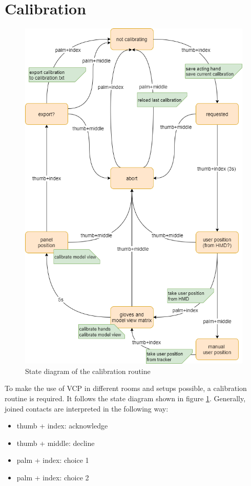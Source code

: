 \documentclass[hyperref, bachelorofscience]{cgvpub}
\begin{document}
\section{Calibration} \label{sec:cal}
\begin{figure}
	\centering
	\includegraphics[width=.95\linewidth]{../pics/calibration}
	\caption{State diagram of the calibration routine}
	\label{fig:cal}
\end{figure}

To make the use of \gls{VCP} in different rooms and setups possible, a calibration routine is required. It follows the state diagram shown in figure \ref{fig:cal}. Generally, joined contacts are interpreted in the following way:
\vspace{.3cm}
\begin{itemize}
	\item thumb + index: acknowledge
	\item thumb + middle: decline
	\item palm + index: choice 1
	\item palm + index: choice 2
\end{itemize}
\end{document}
